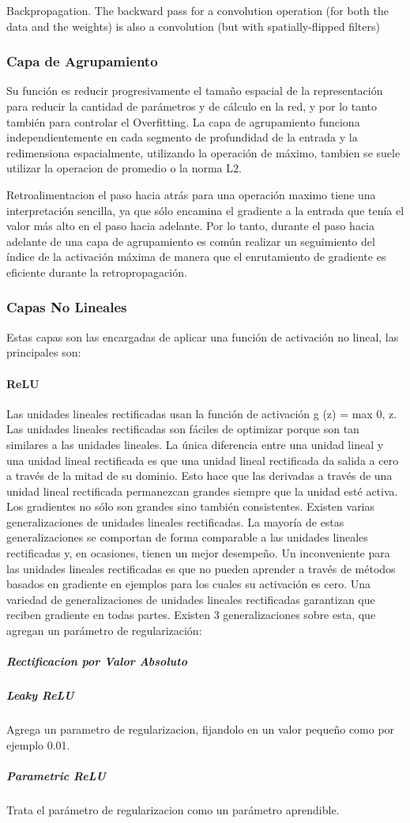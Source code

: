 \documentclass[a4paper,11pt,spanish]{book}
\begin{document}
	Backpropagation. The backward pass for a convolution operation (for both the data and the weights) is also a convolution (but with spatially-flipped filters)

      \subsubsection{Capa de Agrupamiento} 
	Su función es reducir progresivamente el tamaño espacial de la representación para reducir la cantidad de parámetros y de cálculo en la red, y por lo tanto también para controlar
	el Overfitting. La capa de agrupamiento funciona independientemente en cada segmento de profundidad de la entrada y la redimensiona espacialmente, utilizando la operación de máximo, 
	tambien se suele utilizar la operacion de promedio o la norma L2.

	Retroalimentacion
	el paso hacia atrás para una operación maximo tiene una interpretación sencilla, ya que sólo encamina el gradiente a la entrada que tenía el valor más alto en el paso hacia
	adelante. Por lo tanto, durante el paso hacia adelante de una capa de agrupamiento es común realizar un seguimiento del índice de la activación máxima de manera que 
	el enrutamiento de gradiente es eficiente durante la retropropagación.

      \subsubsection{Capas No Lineales}
	Estas capas son las encargadas de aplicar una función de activación no lineal, las principales son:
	\paragraph{ReLU} Las unidades lineales rectificadas usan la función de activación g (z) = max {0, z}. 
	Las unidades lineales rectificadas son fáciles de optimizar porque son tan similares a las unidades lineales. 
	La única diferencia entre una unidad lineal y una unidad lineal rectificada es que una unidad lineal rectificada da salida a cero a través de la mitad de su dominio. 
	Esto hace que las derivadas a través de una unidad lineal rectificada permanezcan grandes siempre que la unidad esté activa.
	Los gradientes no sólo son grandes sino también consistentes.
	Existen varias generalizaciones de unidades lineales rectificadas. La mayoría de estas generalizaciones se comportan de forma comparable a las unidades lineales rectificadas
	y, en ocasiones, tienen un mejor desempeño. Un inconveniente para las unidades lineales rectificadas es que no pueden aprender a través de métodos basados ​​en 
	gradiente en ejemplos para los cuales su activación es cero. Una variedad de generalizaciones de unidades lineales rectificadas garantizan que reciben gradiente en 
	todas partes. Existen 3 generalizaciones sobre esta, que agregan un parámetro de regularización:
	  \subparagraph{Rectificacion por Valor Absoluto}
	  \subparagraph{Leaky ReLU} Agrega un parametro de regularizacion, fijandolo en un valor pequeño como por ejemplo 0.01.
	  \subparagraph{Parametric ReLU} Trata el parámetro de regularizacion como un parámetro aprendible.
\end{document}
